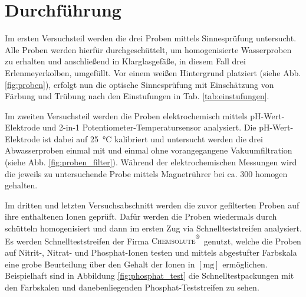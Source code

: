 \chapter{Durchführung}
\label{sec:durchfuerung}

Im ersten Versuchsteil werden die drei Proben mittels Sinnesprüfung untersucht. Alle Proben werden hierfür durchgeschüttelt, um homogenisierte Wasserproben zu erhalten und anschließend in Klarglasgefäße, in diesem Fall drei Erlenmeyerkolben, umgefüllt. Vor einem weißen Hintergrund platziert (siehe Abb. \ref{fig:proben}), erfolgt nun die optische Sinnesprüfung mit Einschätzung von Färbung und Trübung nach den Einstufungen in Tab. \ref{tab:einstufungen}. 



Im zweiten Versuchsteil werden die Proben elektrochemisch mittels pH-Wert-Elektrode und 2-in-1 Potentiometer-Temperatursensor analysiert. Die pH-Wert-Elektrode ist dabei auf \SI{25}{\celsius} kalibriert und untersucht werden die drei Abwasserproben einmal mit und einmal ohne vorangegangene Vakuumfiltration (siehe Abb. \ref{fig:proben_filter}). \linebreak Während der elektrochemischen Messungen wird die jeweils zu untersuchende Probe mittels Magnetrührer bei ca. \SI{300}{\rpm} homogen gehalten.


Im dritten und letzten Versuchsabschnitt werden die zuvor gefilterten Proben auf ihre enthaltenen Ionen geprüft. Dafür werden die Proben wiedermals durch schütteln homogenisiert und dann im ersten Zug via Schnellteststreifen analysiert. Es werden Schnellteststreifen der Firma \textsc{Chemsolute$^{\textsuperscript{\textregistered}}$} genutzt, welche die Proben auf Nitrit-, Nitrat- und Phosphat-Ionen testen und mittels abgestufter Farbskala eine grobe Beurteilung über den Gehalt der Ionen in $\left[\si{\milli \gram}\right]$ ermöglichen. Beispielhaft sind in Abbildung \ref{fig:phosphat_test} die Schnelltestpackungen mit den Farbskalen und danebenliegenden Phosphat-Teststreifen zu sehen.\\
